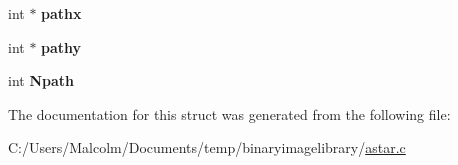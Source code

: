 \begin{DoxyCompactItemize}
\item 
int $\ast$ {\bfseries pathx}\hypertarget{struct_b_a_l_l_o_o_n_ac621abfcd3ff3f7723bdea2a27958373}{}\label{struct_b_a_l_l_o_o_n_ac621abfcd3ff3f7723bdea2a27958373}

\item 
int $\ast$ {\bfseries pathy}\hypertarget{struct_b_a_l_l_o_o_n_a27c1b2f655569a48a3dab4efc4d176cb}{}\label{struct_b_a_l_l_o_o_n_a27c1b2f655569a48a3dab4efc4d176cb}

\item 
int {\bfseries Npath}\hypertarget{struct_b_a_l_l_o_o_n_ae1c9ea29b29e7aadaff70947a4d26a71}{}\label{struct_b_a_l_l_o_o_n_ae1c9ea29b29e7aadaff70947a4d26a71}

\end{DoxyCompactItemize}


The documentation for this struct was generated from the following file\+:\begin{DoxyCompactItemize}
\item 
C\+:/\+Users/\+Malcolm/\+Documents/temp/binaryimagelibrary/\hyperlink{astar_8c}{astar.\+c}\end{DoxyCompactItemize}
